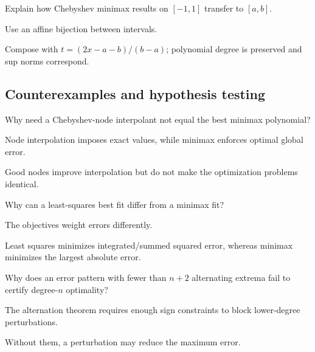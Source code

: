 \begin{exercise}\label{exr:ii22-expand-09}
Explain how Chebyshev minimax results on \([-1,1]\) transfer to \([a,b]\).
\end{exercise}
\begin{hint}
Use an affine bijection between intervals.
\end{hint}
\begin{solution}
Compose with \(t=(2x-a-b)/(b-a)\); polynomial degree is preserved and sup norms correspond.
\end{solution}

\subsection*{Counterexamples and hypothesis testing}

\begin{exercise}\label{exr:ii22-expand-10}
Why need a Chebyshev-node interpolant not equal the best minimax polynomial?
\end{exercise}
\begin{hint}
Node interpolation imposes exact values, while minimax enforces optimal global error.
\end{hint}
\begin{solution}
Good nodes improve interpolation but do not make the optimization problems identical.
\end{solution}

\begin{exercise}\label{exr:ii22-expand-11}
Why can a least-squares best fit differ from a minimax fit?
\end{exercise}
\begin{hint}
The objectives weight errors differently.
\end{hint}
\begin{solution}
Least squares minimizes integrated/summed squared error, whereas minimax minimizes the largest absolute error.
\end{solution}

\begin{exercise}\label{exr:ii22-expand-12}
Why does an error pattern with fewer than \(n+2\) alternating extrema fail to certify degree-\(n\) optimality?
\end{exercise}
\begin{hint}
The alternation theorem requires enough sign constraints to block lower-degree perturbations.
\end{hint}
\begin{solution}
Without them, a perturbation may reduce the maximum error.
\end{solution}

